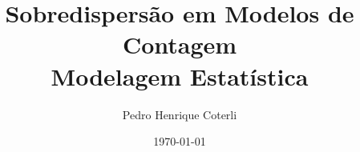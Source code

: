 \title{Sobredispersão em Modelos de Contagem\\Modelagem Estatística}
\author{Pedro Henrique Coterli}
\date{\today}